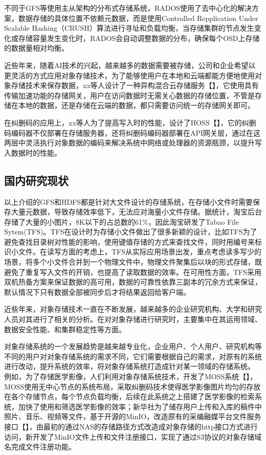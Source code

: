 不同于GFS等使用主从架构的分布式存储系统，RADOS使用了去中心化的解决方案，数据存储的具体位置不依赖元数据，而是使用Controlled Repplication Under Scalable Hashing\cite{31}（CRUSH）算法进行寻址和负载均衡，当存储集群的节点发生变化或存储容量发生变化时，RADOS会自动调整数据的分布，确保每个OSD上存储的数据量相对均衡。

近些年来，随着AI技术的兴起，越来越多的数据需要被存储，公司和企业希望以更灵活的方式应用对象存储技术，为了能够使用户在本地和云端都能方便地使用对象存储技术来保存数据，xx等人设计了一种异构混合云存储服务【】，它使用具有传输加速功能的存储网关，用户在访问数据时无需关心数据的存储位置，不管是存储在本地的数据，还是存储在云端的数据，都只需要访问统一的存储网关即可。

在纠删码的应用上，xx等人为了提高写入时的性能，设计了HOSS【】，它的纠删码编码器不仅部署在存储服务器，还将纠删码编码器部署在API网关层，通过在这两层中灵活执行对象数据的编码来解决系统中网络或处理器的资源瓶颈，以提升写入数据时的性能。

\subsection{国内研究现状}%
以上介绍的GFS和HDFS都是针对大文件设计的存储系统，在存储小文件时需要保存大量元数据，导致存储效率低下，无法应对海量小文件存储。据统计，淘宝后台存储了大量的小图片，8K以下的占总数的61$\%$\cite{14}，因此淘宝研发了Tabao File Sytem(TFS)\cite{15}。TFS在设计时为存储小文件做出了很多新颖的设计，比如TFS为了避免查找目录树对性能的影响，使用键值存储的方式来查找文件，同时用编号来标识小文件。在读写方面的考虑上，TFS从实际应用场景出发，重点考虑读多写少的场景，将多个小文件合并到一个物理文件中，物理文件聚集后以块的形式存储，既避免了重复写入文件的开销，也提高了读取数据的效率。在可用性方面，TFS采用双机热备\cite{16}方案来保证数据的高可用，数据的可靠性依靠三副本的冗余方式来保证，默认情况下只有数据全部被同步后才将结果返回给客户端。

近些年来，对象存储技术一直在不断发展，越来越多的企业研究机构、大学和研究人员对其进行了相关的分析。在对对象存储进行研究时，主要集中在其运用领域、数据安全性能、和集群稳定性等方面。

对象存储系统的一个发展趋势是越来越专业化，企业用户、个人用户、研究机构等不同的用户对对象存储系统的需求不同，它们需要根据自己的需求，对原有的系统进行改动，提升系统的效率，将对象存储系统打造成针对某一领域的存储系统\cite{17,18}。 例如，为了存储医学影像，人们利用对象存储系统技术，开发了MOSS系统【】，MOSS使用无中心节点的系统布局，采取纠删码技术使得医学影像图片均匀的存放在各个存储节点，每个节点负载均衡，后续在此系统之上搭建了医学影像的检索系统，加快了使用和筛选医学影像的效率；新华社为了储存用户上传和入库的稿件中照片、音乐、视频等文件，基于开源的MinIO，改造原有的采编融媒平台文件服务接口【】，由最初的通过NAS的存储路径方式改造成对象存储的http接口方式进行访问，新开发了MinIO文件上传和文件注册接口，实现了通过S3协议的对象存储域名完成文件注册功能。

